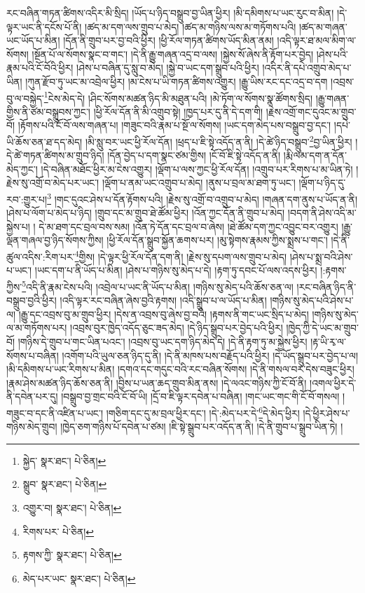 རང་བཞིན་གཏན་ཚིགས་འདིར་མི་སྲིད། །ཡོད་པ་ཉིད་བསྒྲུབ་བྱ་ཡིན་ཕྱིར། །མི་དམིགས་པ་ཡང་རུང་བ་མིན། །དེ་ལྟར་ཡང་ནི་དངོས་པོ་ནི། །ཚད་མ་དག་ལས་གྲུབ་པ་མེད། །ཚད་མ་གཉིས་ལས་མ་གཏོགས་པའི། །ཚད་མ་གཞན་ཡང་ཡོད་པ་མིན། །དོན་ནི་གྲུབ་པར་བྱ་བའི་ཕྱིར། །ཕྱི་རོལ་གཏན་ཚིགས་ཡོད་མིན་ནམ། །འདི་ལྟར་ཐ་མལ་མིག་ལ་སོགས། །སྔོན་པོ་ལ་སོགས་སྣང་བ་གང་། །དེ་ནི་རྒྱུ་གཞན་འདྲ་བ་ལས། །སྐྱེས་སོ་ཞེས་ནི་རྟོག་པར་བྱེད། །ཤེས་པའི་རྣམ་པའི་ངོ་བོའི་ཕྱིར། །ཤེས་པ་བཞིན་དུ་སླུ་བ་མེད། །སྐྱེ་བ་ཡང་དག་སྒྲུབ་པའི་ཕྱིར། །འདིར་ནི་དཔེ་འགྲུབ་མེད་པ་ཡིན། །ཀུན་རྫོབ་ཏུ་ཡང་མ་འབྲེལ་ཕྱིར། །མ་ངེས་པ་ཡི་གཏན་ཚིགས་འགྱུར། །རྒྱུ་ཡིས་རང་དང་འདྲ་བ་དག །འབྲས་བུ་ལ་བསྐྱེད་\footnote{སྐྱེད་  སྣར་ཐང་།  པེ་ཅིན། }ངེས་མེད་དེ། །ཤིང་སོགས་མཚན་ཉིད་མི་མཐུན་པའི། །མེ་ཏོག་ལ་སོགས་སྣ་ཚོགས་སྲིད། །རྒྱུ་གཞན་གྱིས་ནི་ཙམ་བསྒྲུབས་ཀྱང་། །ཕྱི་རོལ་དོན་ནི་མི་འགྲུབ་སྟེ། །ཁྱད་པར་དུ་ནི་དེ་དག་གི། །རྗེས་འགྲོ་གང་དུའང་མ་གྲུབ་བོ། །རྟོགས་པའི་ངོ་བོ་ལས་གཞན་པ། །གཟུང་བའི་རྣམ་པ་སྔོ་ལ་སོགས། །ཡང་དག་མེད་པས་བསྒྲུབ་བྱ་དང་། །དཔེ་ཡི་ཆོས་ཅན་ཐ་དད་མེད། །མི་སླུ་བར་ཡང་ཕྱི་རོལ་དོན། །ཕྲད་པ་ཇི་སྟེ་འདོད་ན་ནི། །དེ་ཚེ་ཉིད་བསྒྲུབ་\footnote{སྒྲུབ་  སྣར་ཐང་།  པེ་ཅིན། }བྱ་ཡིན་ཕྱིར། །དེ་ཚེ་གཏན་ཚིགས་མ་གྲུབ་ཉིད། །དོན་བྱེད་པ་དག་སྣང་ཙམ་གྱིས། །ངོ་བོ་ཇི་སྟེ་འདོད་ན་ནི། །རྨི་ལམ་དག་ན་དོན་མེད་ཀྱང་། །དེ་བཞིན་མཐོང་ཕྱིར་མ་ངེས་འགྱུར། །ལྡོག་པ་ལས་ཀྱང་ཕྱི་རོལ་དོན། །འགྲུབ་པར་རིགས་པ་མ་ཡིན་ཏེ། །རྗེས་སུ་འགྲོ་བ་མེད་པར་ཡང་། །ལྡོག་པ་ནམ་ཡང་འགྲུབ་པ་མེད། །ནུས་པ་བྲལ་མ་ཐག་ཏུ་ཡང་། །ལྡོག་པ་ཉིད་དུ་རབ་:གྱུར་པ།\footnote{འགྱུར་བ།  སྣར་ཐང་།  པེ་ཅིན། } །གང་དུའང་ཤེས་པ་དོན་རྟོགས་པའི། །རྗེས་སུ་འགྲོ་བ་འགྲུབ་པ་མེད། །གཞན་དག་ནུས་པ་ཡོད་ན་ནི། །ཤེས་པ་ལོག་པ་མེད་པ་ཉིད། །གྲུབ་དང་མ་གྲུབ་ཐེ་ཚོམ་ཕྱིར། །འོན་ཀྱང་དོན་ནི་གྲུབ་པ་མེད། །བདག་ནི་ཤེས་འདི་མ་སྐྱེས་པ། །
དེ་མ་ཐག་དང་བྲལ་བས་སམ། །འོན་ཏེ་དོན་དང་བྲལ་བ་ཞེས། །ཐེ་ཚོམ་དག་ཀྱང་འབྱུང་བར་འགྱུར། །རྒྱུ་ལྡན་གཞལ་བྱ་ཉིད་སོགས་ཀྱིས། །ཕྱི་རོལ་དོན་སྒྲུབ་སྐྱོན་ཆགས་པར། །མུ་སྟེགས་རྣམས་ཀྱིས་སྨྲས་པ་གང་། །དེ་ནི་ཚུལ་འདིས་:རིག་པར་\footnote{རིགས་པར་  པེ་ཅིན། }གྱིས། །དེ་ལྟར་ཕྱི་རོལ་དོན་དག་ནི། །རྗེས་སུ་དཔག་ལས་གྲུབ་པ་མེད། །ཤེས་པ་སྨྲ་བའི་ཤེས་པ་ཡང་། །ཡང་དག་པ་ནི་ཡོད་པ་མིན། །ཤེས་པ་གཉིས་སུ་མེད་པ་དེ། །རྟག་ཏུ་དབང་པོ་ལས་འདས་ཕྱིར། །:རྟགས་ཀྱིས་\footnote{རྟགས་ཀྱི་  སྣར་ཐང་།  པེ་ཅིན། }འདི་ནི་རྣམ་ངེས་པའི། །འབྲེལ་པ་ཡང་ནི་ཡོད་པ་མིན། །གཉིས་སུ་མེད་པའི་ཆོས་ཅན་ལ། །རང་བཞིན་ཉིད་ནི་བསྒྲུབ་བྱའི་ཕྱིར། །འདི་ལྟར་རང་བཞིན་ཞེས་བྱའི་རྟགས། །འདི་སྒྲུབ་པ་ལ་ཡོད་པ་མིན། །གཉིས་སུ་མེད་པའི་ཤེས་པ་ལ། །རྒྱུ་དང་འབྲས་བུ་མ་གྲུབ་ཕྱིར། །དེས་ན་འབྲས་བུ་ཞེས་བྱ་བའི། །རྟགས་ནི་གང་ཡང་སྲིད་པ་མེད། །གཉིས་སུ་མེད་ལ་མ་གཏོགས་པར། །འབྲས་བུར་ཁྱེད་འདོད་ཅུང་ཟད་མེད། །དེ་ཉིད་སྒྲུབ་པར་བྱེད་པའི་ཕྱིར། །ཁྱེད་ཀྱི་དེ་ཡང་མ་གྲུབ་བོ། །གཉིས་དེ་གྲུབ་པ་གང་ཡིན་པའང་། །འབྲས་བུ་ཡང་དག་ཉིད་མེད་དེ། །དེ་ནི་རྟག་ཏུ་མ་སྐྱེས་ཕྱིར། །རྟ་ཡི་རྭ་ལ་སོགས་པ་བཞིན། །འགོག་པའི་ཡུལ་ཅན་ཉིད་དུ་ནི། །དེ་ནི་མཁས་པས་བརྗོད་པའི་ཕྱིར། །དེ་ཡོད་སྒྲུབ་པར་བྱེད་པ་ལ། །མི་དམིགས་པ་ཡང་རིགས་པ་མིན། །དགའ་དང་གདུང་བའི་རང་བཞིན་སོགས། །དེ་ནི་གསལ་བར་དེས་བཟུང་ཕྱིར། །རྣམ་ཤེས་མཚན་ཉིད་ཆོས་ཅན་ནི། །བྱིས་པ་ཡན་ཆད་གྲུབ་མིན་ནས། །དེ་ལའང་གཉིས་ཀྱི་ངོ་བོ་ནི། །འགལ་ཕྱིར་དེ་ནི་དབེན་པར་དུ། །བསྒྲུབ་བྱ་གྲང་བའི་ངོ་བོ་ཡི། །དྲོ་བ་ཇི་ལྟར་དབེན་པ་བཞིན། །གང་ཡང་གང་གི་ངོ་བོ་གསལ། །གཟུང་བ་དང་ནི་འཛིན་པ་ཡང་། །གཅིག་དང་དུ་མ་བྲལ་ཕྱིར་དང་། །དེ་:མེད་པར་དེ་\footnote{མེད་པར་ཡང་  སྣར་ཐང་།  པེ་ཅིན། }དེ་མེད་ཕྱིར། །དེ་ཕྱིར་ཤེས་པ་གཉིས་མེད་གྲུབ། །ཁྱེད་ཅག་གཉིས་པོ་དབེན་པ་ཙམ། །ཇི་སྟེ་སྒྲུབ་པར་འདོད་ན་ནི། །དེ་ནི་གྲུབ་པ་སྒྲུབ་ཡིན་ཏེ། །
